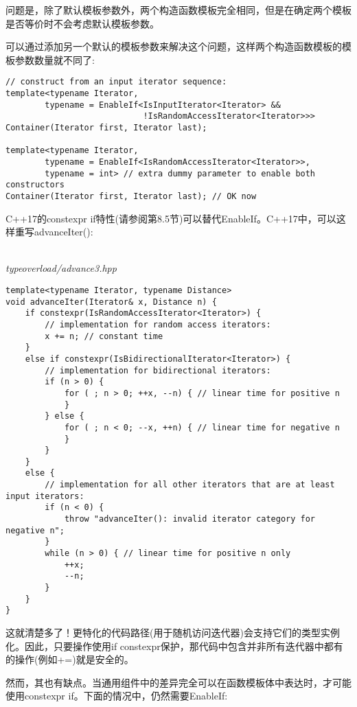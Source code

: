 问题是，除了默认模板参数外，两个构造函数模板完全相同，但是在确定两个模板是否等价时不会考虑默认模板参数。

可以通过添加另一个默认的模板参数来解决这个问题，这样两个构造函数模板的模板参数数量就不同了:

\begin{lstlisting}[style=styleCXX]
// construct from an input iterator sequence:
template<typename Iterator,
		typename = EnableIf<IsInputIterator<Iterator> &&
							!IsRandomAccessIterator<Iterator>>>
Container(Iterator first, Iterator last);

template<typename Iterator,
		typename = EnableIf<IsRandomAccessIterator<Iterator>>,
		typename = int> // extra dummy parameter to enable both constructors
Container(Iterator first, Iterator last); // OK now
\end{lstlisting}


C++17的constexpr if特性(请参阅第8.5节)可以替代EnableIf。C++17中，可以这样重写advanceIter():

\hspace*{\fill} \\ %
\noindent
\textit{typeoverload/advance3.hpp}
\begin{lstlisting}[style=styleCXX]
template<typename Iterator, typename Distance>
void advanceIter(Iterator& x, Distance n) {
	if constexpr(IsRandomAccessIterator<Iterator>) {
		// implementation for random access iterators:
		x += n; // constant time
	}
	else if constexpr(IsBidirectionalIterator<Iterator>) {
		// implementation for bidirectional iterators:
		if (n > 0) {
			for ( ; n > 0; ++x, --n) { // linear time for positive n
			}
		} else {
			for ( ; n < 0; --x, ++n) { // linear time for negative n
			}
		}
	}
	else {
		// implementation for all other iterators that are at least input iterators:
		if (n < 0) {
			throw "advanceIter(): invalid iterator category for negative n";
		}
		while (n > 0) { // linear time for positive n only
			++x;
			--n;
		}
	}
}
\end{lstlisting}

这就清楚多了！更特化的代码路径(用于随机访问迭代器)会支持它们的类型实例化。因此，只要操作使用if constexpr保护，那代码中包含并非所有迭代器中都有的操作(例如+=)就是安全的。

然而，其也有缺点。当通用组件中的差异完全可以在函数模板体中表达时，才可能使用constexpr if。下面的情况中，仍然需要EnableIf:


